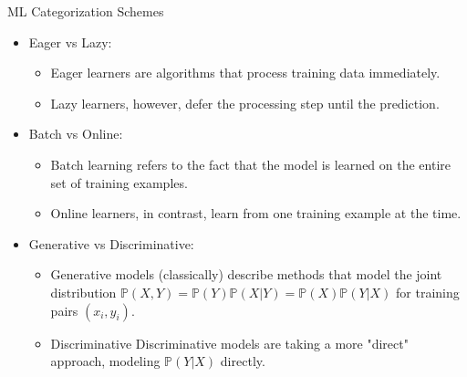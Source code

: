 \documentclass[compress,oilve]{beamer}
\newcommand{\tc}[2]{
	\textcolor{#1}{\hspace{-2pt}#2\hspace{-2pt}}
}
\begin{document}
\begin{frame}{ML Categorization Schemes}
	\begin{itemize}
		\item Eager vs Lazy:
		\begin{itemize}
			\item \tc{keywords}{Eager} learners are algorithms that process training data immediately.
			
			\item \tc{keywords}{Lazy} learners, however, defer the processing step until the prediction. 
			
		\end{itemize}
	
	\medskip
		\item Batch vs Online:
		
		\begin{itemize}
			\item \tc{keywords}{Batch} learning refers to the fact that the model is learned on the entire set of training examples.
			
			\item \tc{keywords}{Online} learners, in contrast, learn from one training example at the time. 
			
		\end{itemize}
	
		\medskip
		\item Generative vs Discriminative:
		
				
		\begin{itemize}
			\item \tc{keywords}{Generative} models (classically) describe methods that
			model the joint distribution $\mathbb{P}(X, Y ) = \mathbb{P}(Y )\mathbb{P}(X|Y ) = \mathbb{P}(X)\mathbb{P}(Y|X)$ for training pairs $(x_i, y_i)$.
			
			
			\item \tc{keywords}{Discriminative} Discriminative models are taking a more "direct" approach, modeling $\mathbb{P}(Y|X)$ directly. 
			
		\end{itemize}
	\end{itemize}
\end{frame}
\end{document}
